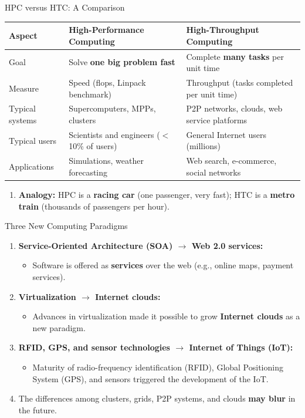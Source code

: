 \begin{frame}{HPC versus HTC: A Comparison}
\begin{table}
\centering
\renewcommand{\arraystretch}{1.35}
\scriptsize
\begin{tabular}{|p{3cm}|p{5cm}|p{5cm}|}
\hline
\textbf{Aspect} & \textbf{High-Performance Computing} & \textbf{High-Throughput Computing} \\ \hline
Goal & Solve \textbf{one big problem fast} & Complete \textbf{many tasks} per unit time \\ \hline
Measure & Speed (flops, Linpack benchmark) & Throughput (tasks completed per unit time) \\ \hline
Typical systems & Supercomputers, MPPs, clusters & P2P networks, clouds, web service platforms \\ \hline
Typical users & Scientists and engineers ($<$10\% of users) & General Internet users (millions) \\ \hline
Applications & Simulations, weather forecasting & Web search, e-commerce, social networks \\ \hline
\end{tabular}
\end{table}
\begin{enumerate}
\item<1-> \textbf{Analogy:} HPC is a \textbf{racing car} (one passenger, very fast); HTC is a \textbf{metro train} (thousands of passengers per hour).
\end{enumerate}
\end{frame}

\begin{frame}{Three New Computing Paradigms}
\begin{enumerate}
\item<1-> \textbf{Service-Oriented Architecture (SOA) $\rightarrow$ Web 2.0 services:}
    \begin{itemize}
    \item Software is offered as \textbf{services} over the web (e.g., online maps, payment services).
    \end{itemize}
\item<2-> \textbf{Virtualization $\rightarrow$ Internet clouds:}
    \begin{itemize}
    \item Advances in virtualization made it possible to grow \textbf{Internet clouds} as a new paradigm.
    \end{itemize}
\item<3-> \textbf{RFID, GPS, and sensor technologies $\rightarrow$ Internet of Things (IoT):}
    \begin{itemize}
    \item Maturity of radio-frequency identification (RFID), Global Positioning System (GPS), and sensors triggered the development of the IoT.
    \end{itemize}
\item<4-> The differences among clusters, grids, P2P systems, and clouds \textbf{may blur} in the future.
\end{enumerate}
\end{frame}

